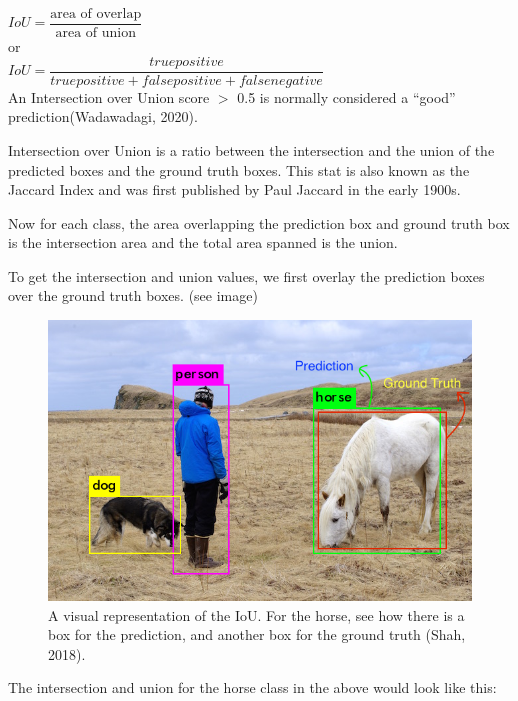 \documentclass[]{article}
\begin{document}
$IoU = \dfrac{\text{area of overlap}}{\text{area of union}}$
\\
or
\\

$IoU = \dfrac{true positive}{true positive + false positive + false negative}$\\

An Intersection over Union score $>$ 0.5 is normally considered a “good” prediction(Wadawadagi, 2020).

Intersection over Union is a ratio between the intersection and the union of the predicted boxes and the ground truth boxes. This stat is also known as the Jaccard Index and was first published by Paul Jaccard in the early 1900s.

Now for each class, the area overlapping the prediction box and ground truth box is the intersection area and the total area spanned is the union.

To get the intersection and union values, we first overlay the prediction boxes over the ground truth boxes. (see image)

\begin{figure}[!h]
	\includegraphics[scale=0.75]{iou2}
	\caption{A visual representation of the IoU.  For the horse, see how there is a box for the prediction, and another box for the ground truth (Shah, 2018).}
	\label{Fig:Race}
\end{figure}
\pagebreak
The intersection and union for the horse class in the above would look like this: 
\end{document}
